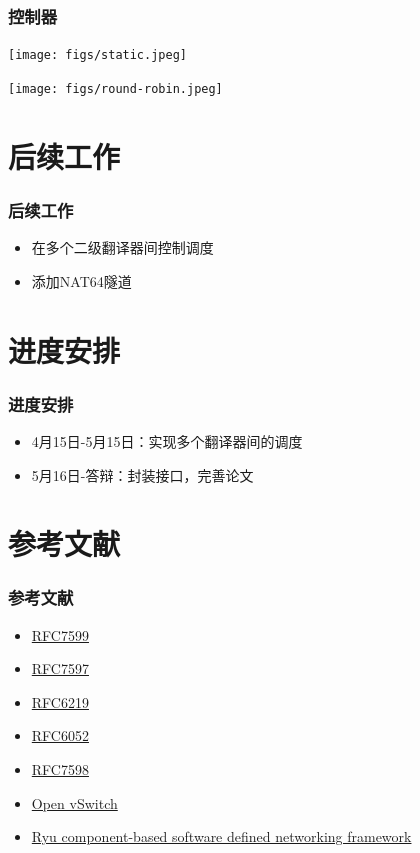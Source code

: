 \documentclass{beamer}
\begin{document}
\begin{frame}
  \frametitle{控制器}

  \begin{center}
    \texttt{[image: figs/static.jpeg]}
  \end{center}

  \begin{center}
    \texttt{[image: figs/round-robin.jpeg]}  
  \end{center}
  
\end{frame}

\section{后续工作}
\begin{frame}
  \frametitle{后续工作}

  \begin{block}{}
    \begin{itemize}
    \item 在多个二级翻译器间控制调度
    \item 添加NAT64隧道
    \end{itemize}
  \end{block}
\end{frame}

\section{进度安排}

\begin{frame}
  \frametitle{进度安排}
  \begin{block}{}
    \begin{itemize}
    \item 4月15日-5月15日：实现多个翻译器间的调度
    \item 5月16日-答辩：封装接口，完善论文
    \end{itemize}
  \end{block}
\end{frame}

\section{参考文献}
\begin{frame}
  \frametitle{参考文献}
  \begin{itemize}
  \item \href{https://tools.ietf.org/html/rfc7599}{RFC7599}
  \item \href{https://tools.ietf.org/html/rfc7597}{RFC7597}
  \item \href{https://tools.ietf.org/html/rfc6219}{RFC6219}
  \item \href{https://tools.ietf.org/html/rfc6052}{RFC6052}
  \item \href{https://tools.ietf.org/html/rfc7598}{RFC7598}
  \item
    \href{http://openvswitch.org/}{Open vSwitch}
  \item
    \href{http://osrg.github.io/ryu/}{Ryu component-based software defined networking framework }
  \end{itemize}
\end{frame}
\end{document}
